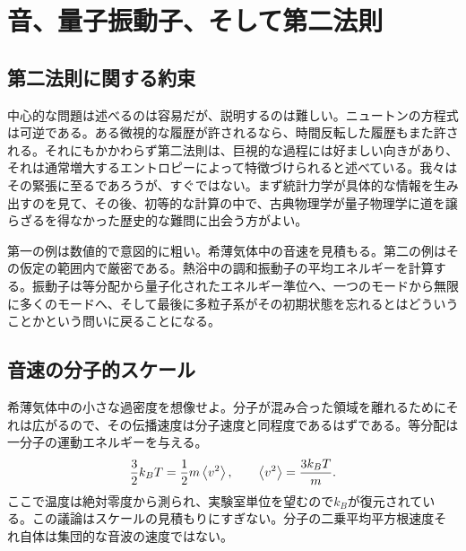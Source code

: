 \chapter{音、量子振動子、そして第二法則}


\section{第二法則に関する約束}

中心的な問題は述べるのは容易だが、説明するのは難しい。ニュートンの方程式は可逆である。ある微視的な履歴が許されるなら、時間反転した履歴もまた許される。それにもかかわらず第二法則は、巨視的な過程には好ましい向きがあり、それは通常増大するエントロピーによって特徴づけられると述べている。我々はその緊張に至るであろうが、すぐではない。まず統計力学が具体的な情報を生み出すのを見て、その後、初等的な計算の中で、古典物理学が量子物理学に道を譲らざるを得なかった歴史的な難問に出会う方がよい。

第一の例は数値的で意図的に粗い。希薄気体中の音速を見積もる。第二の例はその仮定の範囲内で厳密である。熱浴中の調和振動子の平均エネルギーを計算する。振動子は等分配から量子化されたエネルギー準位へ、一つのモードから無限に多くのモードへ、そして最後に多粒子系がその初期状態を忘れるとはどういうことかという問いに戻ることになる。

\section{音速の分子的スケール}

希薄気体中の小さな過密度を想像せよ。分子が混み合った領域を離れるためにそれは広がるので、その伝播速度は分子速度と同程度であるはずである。等分配は一分子の運動エネルギーを与える。\begin{equation}
 \frac{3}{2}k_B T
 =\frac{1}{2}m\left\langle v^2\right\rangle,
 \qquad
 \left\langle v^2\right\rangle=\frac{3k_B T}{m}.
 \label{eq:sm7-molecular-speed}
\end{equation}
ここで温度は絶対零度から測られ、実験室単位を望むので\(k_B\)が復元されている。この議論はスケールの見積もりにすぎない。分子の二乗平均平方根速度それ自体は集団的な音波の速度ではない。

